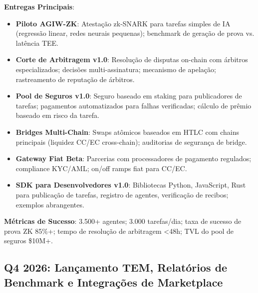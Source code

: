 \documentclass[11pt]{article}
\begin{document}
\begin{itemize}[noitemsep]
\begin{itemize}[noitemsep]
\begin{itemize}[noitemsep]
\textbf{Entregas Principais}:
\begin{itemize}[noitemsep]
  \item \textbf{Piloto AGIW-ZK}: Atestação zk-SNARK para tarefas simples de IA (regressão linear, redes neurais pequenas); benchmark de geração de prova vs. latência TEE.
  \item \textbf{Corte de Arbitragem v1.0}: Resolução de disputas on-chain com árbitros especializados; decisões multi-assinatura; mecanismo de apelação; rastreamento de reputação de árbitros.
  \item \textbf{Pool de Seguros v1.0}: Seguro baseado em staking para publicadores de tarefas; pagamentos automatizados para falhas verificadas; cálculo de prêmio baseado em risco da tarefa.
  \item \textbf{Bridges Multi-Chain}: Swaps atômicos baseados em HTLC com chains principais (liquidez CC/EC cross-chain); auditorias de segurança de bridge.
  \item \textbf{Gateway Fiat Beta}: Parcerias com processadores de pagamento regulados; compliance KYC/AML; on/off ramps fiat para CC/EC.
  \item \textbf{SDK para Desenvolvedores v1.0}: Bibliotecas Python, JavaScript, Rust para publicação de tarefas, registro de agentes, verificação de recibos; exemplos abrangentes.
\end{itemize}

\textbf{Métricas de Sucesso}: 3.500+ agentes; 3.000 tarefas/dia; taxa de sucesso de prova ZK 85\%+; tempo de resolução de arbitragem <48h; TVL do pool de seguros \$10M+.

\subsection{Q4 2026: Lançamento TEM, Relatórios de Benchmark e Integrações de Marketplace}


\end{itemize}
\end{itemize}
\end{itemize}
\end{document}
